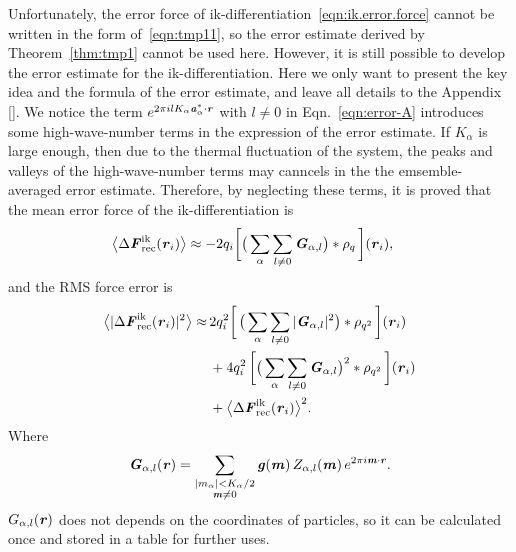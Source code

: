 \documentclass[aps,pre,preprint]{revtex4}
\renewcommand{\v}[1]{\textbf{\textit{#1}}}
\begin{document}
Unfortunately, the
error force of ik-differentiation~\eqref{eqn:ik.error.force} cannot be written
in the form of~\eqref{eqn:tmp11}, so the error estimate derived by
Theorem~\ref{thm:tmp1} cannot be used here. However, it is still
possible to develop the error estimate for the ik-differentiation.
Here we only want to present the key idea and the formula of the error
estimate, and leave all details to the Appendix \ref{}.  We notice the
term $e^{2\pi i l K_\alpha\v a^\ast_\alpha\cdot\v r}$ with $l\neq 0$
in Eqn.~\eqref{eqn:error-A} introduces some high-wave-number terms in
the expression of the error estimate.  If $K_\alpha$ is large enough,
then due to the thermal fluctuation of the system, the peaks and
valleys of the high-wave-number terms may canncels in the the
emsemble-averaged error estimate.
Therefore, by neglecting these terms, it is proved that the mean error
force of the ik-differentiation is
\begin{align}\label{eqn:ik.meanf}
  \big\langle
  \Delta\v F_{\textrm{rec}}^{\textrm{ik}}(\v r_i)
  \big\rangle
  & \approx
  - 2 q_i
  \bigg[
  \big(
  \sum_{\alpha}\sum_{l\neq 0}\v G_{\alpha,l}
  \big)
  \ast\rho_q\,
  \bigg] (\v r_i),
\end{align}
and the RMS force error is 
\begin{align}\nonumber
  \big\langle
  \vert\Delta\v F_{\textrm{rec}}^{\textrm{ik}}(\v r_i)\vert^2
  \big\rangle
  \approx&\, 
  2q_i^2
  \bigg[\,
  \big(
  \sum_{\alpha} \sum_{l\neq 0}
  \vert \v G_{\alpha,l}\vert^2
  \big)
  \ast \rho_{q^2}
  \,\bigg] (\v r_i)\\\nonumber
  &\,+
  4q_i^2\,
  \bigg[
  \big(
  \sum_{\alpha} \sum_{l\neq 0}  
  \v G_{\alpha,l}
  \big)^2
  \ast \rho_{q^2}\,
  \bigg] (\v r_i) \\\label{eqn:ik.error}
  &\,+
  \big\langle
  \Delta\v F_{\textrm{rec}}^{\textrm{ik}}(\v r_i)
  \big\rangle^2.
\end{align}
Where
\begin{align}
  \v G_{\alpha,l}(\v r) =
  \sum_{
    \begin{subarray}{c}
      \vert m_{\alpha}\vert < K_\alpha/2\\
      \v m\neq 0
    \end{subarray}}
  \v g(\v m)\,
  Z_{\alpha,l}(\v m)\,
  e^{2\pi i\v m\cdot\v r}.
\end{align}
$G_{\alpha,l}(\v r)$ does not depends on the coordinates of particles,
so it can be calculated once and stored in a table for further uses.
\end{document}

